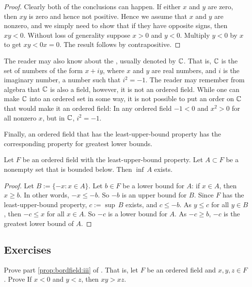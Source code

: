 \begin{proof}
Clearly both of the conclusions can happen.  If either
$x$ and $y$ are zero, then $xy$ is zero and hence not positive.
Hence we assume that $x$ and $y$ are nonzero,
and we simply need to show that if they have opposite signs, then
$xy < 0$.
Without loss of
generality suppose $x > 0$ and $y < 0$.  Multiply $y < 0$ by $x$ to get
$xy < 0x = 0$.  The result follows by contrapositive.
\end{proof}

\begin{example} \label{example:complexfield}
The reader may also know about the \emph{},
usually denoted by
${\mathbb{C}}$.  That is, ${\mathbb{C}}$ is the set of numbers of
the form $x + iy$, where $x$ and $y$ are real numbers, and $i$ is the
imaginary number, a number such that $i^2 = -1$.  The reader may
remember from algebra that ${\mathbb{C}}$ is also a field, however, it is not an
ordered field.  While one can make ${\mathbb{C}}$ into an ordered set in some way,
it is not possible to put an
order on ${\mathbb{C}}$ that would make it an ordered field: In any ordered field
$-1 < 0$ and $x^2 > 0$ for all nonzero $x$, but in ${\mathbb{C}}$, $i^2 = -1$.
\end{example}

Finally, an ordered field that has the least-upper-bound property has the
corresponding property for greatest lower bounds.

\begin{prop}
Let $F$ be an ordered field with the least-upper-bound property.
Let $A \subset F$ be a nonempty set that is bounded below.
Then $\inf\, A$ exists.
\end{prop}

\begin{proof}
Let $B := \{ -x : x \in A \}$. Let $b \in F$ be a lower bound for $A$:
if $x \in A$, then $x \geq b$. In other words, $-x \leq -b$.  So $-b$
is an upper bound for $B$.
Since $F$ has the least-upper-bound property, $c:=\sup\, B$ exists, and $c \leq -b$.
As $y \leq c$
for all $y \in B$, then $-c \leq x$ for all $x \in A$.
So
$-c$ is a lower bound for $A$.  As $-c \geq b$,
$-c$ is the greatest lower bound of $A$.
\end{proof}

\subsection{Exercises}

\begin{exercise}
Prove part \ref{prop:bordfield:iii} of .
That is, let $F$ be an ordered field and $x,y,z \in F$.  Prove
If $x < 0$ and $y < z$, then $xy > xz$.
\end{exercise}


